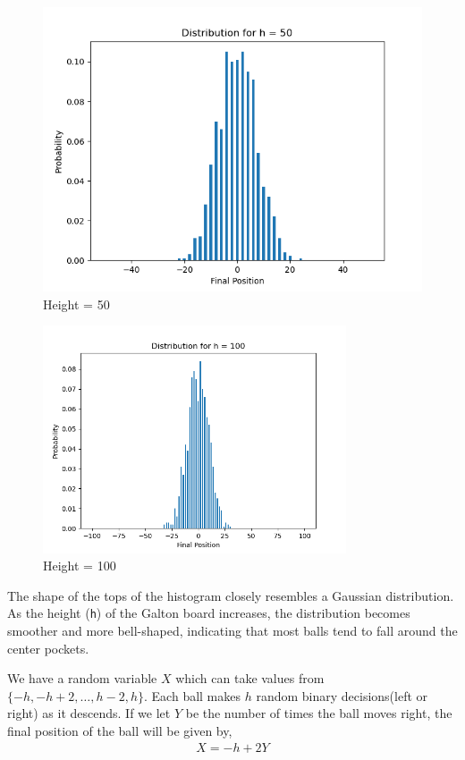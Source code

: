 \begin{solution}
\begin{figure}[H]
\begin{minipage}{0.5\textwidth}
			\includegraphics[width=\linewidth]{../images/2d2.png}
			\caption{Height = 50}
		\end{minipage}\hfill		
	\end{figure}
	\begin{figure}[H]
		\centering
		\includegraphics[width=0.8\textwidth]{../images/2d3.png}
		\caption{Height = 100}
		
	\end{figure}

	The shape of the tops of the histogram closely resembles a Gaussian distribution. As the height (\texttt{h}) of the Galton board increases, the distribution becomes smoother and more bell-shaped, indicating that most balls tend to fall around the center pockets.

	We have a random variable $X$ which can take values from
	$\{-h,-h+2,\ldots,h-2,h\}$. Each ball makes $h$ random binary
	decisions(left or right) as it descends. If we let $Y$ be the number of
	times the ball moves right, the final position of the ball will be
	given by,
	\begin{align}
		X = -h+2Y
	\end{align}


\end{solution}
